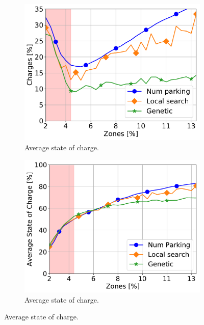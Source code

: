 \begin{figure}[t!]
	\begin{center}
		\begin{subfigure}{0.49\textwidth}
			\includegraphics[width=\columnwidth]{figures/Hybrid_AmountRechargePerc.pdf}
			\caption{Average state of charge.}
			\label{fig:7_7a_recharge}
		\end{subfigure}
		\begin{subfigure}{0.49\textwidth}
			\includegraphics[width=\columnwidth]{figures/AvgSOC_comparison}
			\caption{Average state of charge.}
			\label{fig:7_7a_asoc_Needed}
		\end{subfigure}
	

\end{center}
\end{figure}
